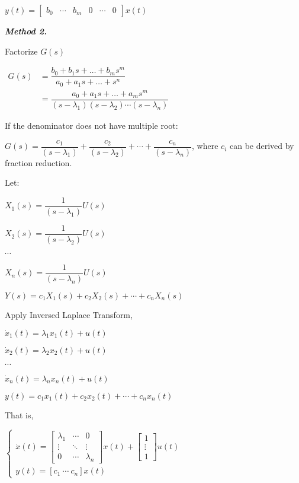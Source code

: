 \documentclass{article}
\newcommand{\smalltitle}[1]{
	\noindent
	\textbf{\textit{#1}}
}
\begin{document}
\begin{spacing}{1.2}
$y(t)=\left[ \begin{array}{cccccc}{b_{0}} & {\cdots} & {b_{m}} & {0} & {\cdots} & {0}\end{array}\right] x(t)$


\smalltitle{Method 2.}

Factorize $G(s)$

$\begin{aligned}
	G(s) & =\dfrac{b_{0}+b_{1} s+\ldots+b_{m} s^{m}}{a_{0}+a_{1} s+\ldots+s^{n}}                                                            \\
	     & =\dfrac{a_{0}+a_{1} s+\ldots+a_{m} s^{m}}{\left(s-\lambda_{1}\right)\left(s-\lambda_{2}\right) \cdots\left(s-\lambda_{n}\right)}
\end{aligned}$

If the denominator does not have multiple root:

$G(s)=\dfrac{c_{1}}{\left(s-\lambda_{1}\right)}+\dfrac{c_{2}}{\left(s-\lambda_{2}\right)}+\cdots+\dfrac{c_{n}}{\left(s-\lambda_{n}\right)}$,
where $c_i$ can be derived by fraction reduction.

Let:

$X_{1}(s)=\dfrac{1}{\left(s-\lambda_{1}\right)} U(s)$

$X_{2}(s)=\dfrac{1}{\left(s-\lambda_{2}\right)} U(s)$

$\cdots$

$X_{n}(s)=\dfrac{1}{\left(s-\lambda_{n}\right)} U(s)$

$Y(s)=c_{1} X_{1}(s)+c_{2} X_{2}(s)+\cdots+c_{n} X_{n}(s)$

Apply Inversed Laplace Transform,

$\dot{x}_{1}(t)=\lambda_{1} x_{1}(t)+u(t)$

$\dot{x}_{2}(t)=\lambda_{2} x_{2}(t)+u(t)$

$\cdots$

$\dot{x}_{n}(t)=\lambda_{n} x_{n}(t)+u(t)$

$y(t)=c_{1} x_{1}(t)+c_{2} x_{2}(t)+\cdots+c_{n} x_{n}(t)$

That is,

$
\left\{
\begin{array}{l}
	\dot{x}(t)=\left[ \begin{array}{ccc}{\lambda_{1}} & {\cdots} & {0}           \\
	{\vdots}                                          & {\ddots} & {\vdots}      \\
	{0}                                               & {\cdots} & {\lambda_{n}}
\end{array}\right] x(t)+\left[ \begin{array}{c}{1}
	         \\
	{\vdots} \\
	  {1}
\end{array}\right] u(t)\\
y(t) = \left[ c_1 \ \cdots \ c_n \right]x(t)
\end{array}
\right.
$



\end{spacing}
\end{document}
